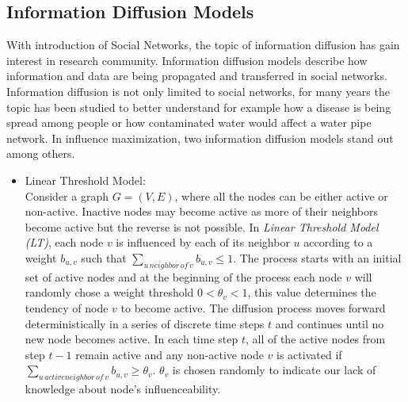 \documentclass[english]{tktltiki}
\begin{document}
\subsection{Information Diffusion Models}
With introduction of Social Networks, the topic of information diffusion has gain interest in research community. 
Information diffusion models describe how information and data are being propagated and transferred in social networks. 
Information diffusion is not only limited to social networks, for many years the topic has been studied to better understand for example how a disease is being spread among people or how contaminated water would affect a water pipe network. 
In influence maximization, two information diffusion models stand out among others. 

\begin{itemize}
\item Linear Threshold Model:\\
Consider a graph $G=(V,E)$, where all the nodes can be either active or non-active. 
Inactive nodes may become active as more of their neighbors become active but the reverse is not possible. 
In \textit{Linear Threshold Model (LT)}, each node $v$ is influenced by each of its neighbor $u$ according to a weight $b_{u,v}$ such that $\sum \nolimits_{u \, neighbor \, of \, v} b_{u,v} \leq 1$. 
The process starts with an initial set of active nodes and at the beginning of the process each node $v$ will randomly chose a weight threshold $0 < \theta_v<1 $, this value determines the tendency of node $v$ to become active. 
The diffusion process moves forward deterministically in a series of discrete time steps $t$ and continues until no new node becomes active. In each time step $t$, all of the active nodes from step $t-1$ remain active and any non-active node $v$ is activated if $\sum \nolimits_{u \, active neighbor \, of \, v} b_{u,v} \geq \theta_v$. 
$\theta_v$ is chosen randomly to indicate our lack of knowledge about node's influenceability.  


\end{itemize}
\end{document}
